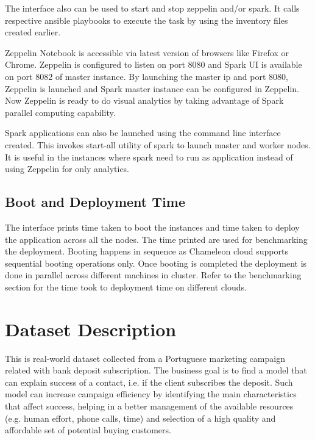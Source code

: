 \documentclass[9pt,twocolumn,twoside]{../../styles/osajnl}
\begin{document}
	The interface also can be used to start and stop zeppelin and/or
	spark. It calls respective ansible playbooks to execute the task 
	by
	using the inventory files created earlier. 
	
	Zeppelin Notebook is accessible via latest version of browsers 
	like
	Firefox or Chrome. Zeppelin is configured to listen on port 8080 
	and
	Spark UI is available on port 8082 of master instance. By 
	launching
	the master ip and port 8080, Zeppelin is launched and Spark master
	instance can be configured in Zeppelin. Now Zeppelin is ready to 
	do
	visual analytics by taking advantage of Spark parallel computing
	capability.
	
	Spark applications can also be launched using the command line
	interface created. This invokes start-all utility of spark to 
	launch
	master and worker nodes. It is useful in the instances where spark
	need to run as application instead of using Zeppelin for only 
	analytics.
	
	\subsection{Boot and Deployment Time}
	
	The interface prints time taken to boot the instances and time 
	taken
	to deploy the application across all the nodes. The time printed 
	are
	used for benchmarking the deployment. Booting happens in sequence 
	as
	Chameleon cloud supports sequential booting operations only. Once
	booting is completed the deployment is done in parallel across
	different machines in cluster. Refer to the benchmarking section 
	for
	the time took to deployment time on different clouds.
	
	\section{Dataset Description}
	
	This is real-world dataset\cite{www-datasetdes} collected from a 
	Portuguese marketing campaign related with bank deposit 
	subscription. 
	The business goal is to find a model that can explain success of 
	a 
	contact, i.e. if the client subscribes the deposit. Such model 
	can 
	increase campaign efficiency by identifying the main 
	characteristics 
	that affect success, helping in a better management of the 
	available 
	resources (e.g. human effort, phone calls, time) and selection of 
	a 
	high quality and affordable set of potential buying customers.
	
\end{document}
